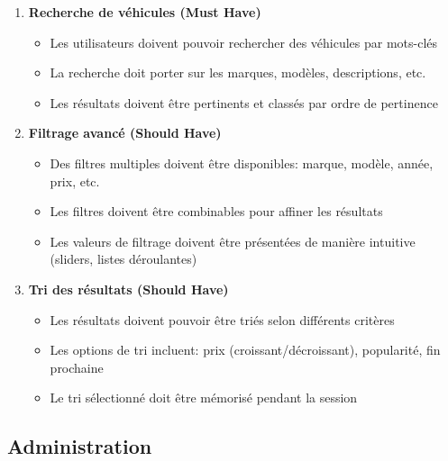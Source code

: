 \begin{enumerate}
    \item \textbf{Recherche de véhicules (Must Have)}
    \begin{itemize}
        \item Les utilisateurs doivent pouvoir rechercher des véhicules par mots-clés
        \item La recherche doit porter sur les marques, modèles, descriptions, etc.
        \item Les résultats doivent être pertinents et classés par ordre de pertinence
    \end{itemize}
    
    \item \textbf{Filtrage avancé (Should Have)}
    \begin{itemize}
        \item Des filtres multiples doivent être disponibles: marque, modèle, année, prix, etc.
        \item Les filtres doivent être combinables pour affiner les résultats
        \item Les valeurs de filtrage doivent être présentées de manière intuitive (sliders, listes déroulantes)
    \end{itemize}
    
    \item \textbf{Tri des résultats (Should Have)}
    \begin{itemize}
        \item Les résultats doivent pouvoir être triés selon différents critères
        \item Les options de tri incluent: prix (croissant/décroissant), popularité, fin prochaine
        \item Le tri sélectionné doit être mémorisé pendant la session
    \end{itemize}
\end{enumerate}

\subsection{Administration}

